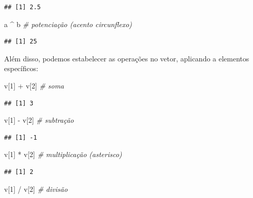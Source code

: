 \documentclass[
]{book}
\newenvironment{Shaded}{\begin{snugshade}}{\end{snugshade}}
\newcommand{\CommentTok}[1]{\textcolor[rgb]{0.56,0.35,0.01}{\textit{#1}}}
\newcommand{\DecValTok}[1]{\textcolor[rgb]{0.00,0.00,0.81}{#1}}
\newcommand{\NormalTok}[1]{#1}
\newcommand{\SpecialCharTok}[1]{\textcolor[rgb]{0.00,0.00,0.00}{#1}}
\begin{document}
\begin{verbatim}
## [1] 2.5
\end{verbatim}

\begin{Shaded}
\begin{Highlighting}[]
\NormalTok{a }\SpecialCharTok{\^{}}\NormalTok{ b }\CommentTok{\# potenciação (acento circunflexo)}
\end{Highlighting}
\end{Shaded}

\begin{verbatim}
## [1] 25
\end{verbatim}

Além disso, podemos estabelecer as operações no vetor, aplicando a elementos específicos:

\begin{Shaded}
\begin{Highlighting}[]
\NormalTok{v[}\DecValTok{1}\NormalTok{] }\SpecialCharTok{+}\NormalTok{ v[}\DecValTok{2}\NormalTok{] }\CommentTok{\# soma}
\end{Highlighting}
\end{Shaded}

\begin{verbatim}
## [1] 3
\end{verbatim}

\begin{Shaded}
\begin{Highlighting}[]
\NormalTok{v[}\DecValTok{1}\NormalTok{] }\SpecialCharTok{{-}}\NormalTok{ v[}\DecValTok{2}\NormalTok{] }\CommentTok{\# subtração}
\end{Highlighting}
\end{Shaded}

\begin{verbatim}
## [1] -1
\end{verbatim}

\begin{Shaded}
\begin{Highlighting}[]
\NormalTok{v[}\DecValTok{1}\NormalTok{] }\SpecialCharTok{*}\NormalTok{ v[}\DecValTok{2}\NormalTok{] }\CommentTok{\# multiplicação (asterisco)}
\end{Highlighting}
\end{Shaded}

\begin{verbatim}
## [1] 2
\end{verbatim}

\begin{Shaded}
\begin{Highlighting}[]
\NormalTok{v[}\DecValTok{1}\NormalTok{] }\SpecialCharTok{/}\NormalTok{ v[}\DecValTok{2}\NormalTok{] }\CommentTok{\# divisão}
\end{Highlighting}
\end{Shaded}
\end{document}

